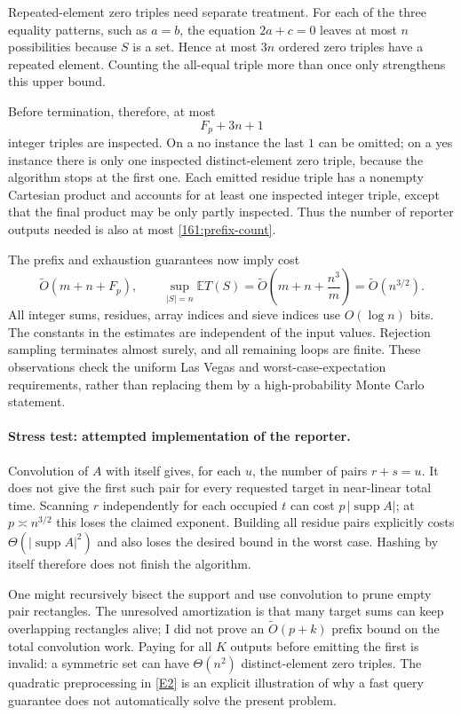 \documentclass[11pt,a4paper]{article}
\newcommand{\E}{\mathbb{E}}
\newcommand{\eref}[2]{\hyperlink{extra:#1:#2}{[E#2]}}
\numberwithin{equation}{section}
\begin{document}
Repeated-element zero triples need separate treatment. For each of the
three equality patterns, such as $a=b$, the equation $2a+c=0$ leaves at
most $n$ possibilities because $S$ is a set. Hence at most $3n$ ordered
zero triples have a repeated element. Counting the all-equal triple more
than once only strengthens this upper bound.

Before termination, therefore, at most
\begin{equation}\label{161:prefix-count}
 F_p+3n+1
\end{equation}
integer triples are inspected. On a no instance the last $1$ can be
omitted; on a yes instance there is only one inspected distinct-element
zero triple, because the algorithm stops at the first one. Each emitted
residue triple has a nonempty Cartesian product and accounts for at
least one inspected integer triple, except that the final product may
be only partly inspected. Thus the number of reporter outputs needed is
also at most \eqref{161:prefix-count}.

The prefix and exhaustion guarantees now imply cost
\[
 \widetilde O(m+n+F_p),\qquad
 \sup_{|S|=n}\E T(S)
 =\widetilde O\left(m+n+\frac{n^3}{m}\right)
 =\widetilde O(n^{3/2}).
\]
All integer sums, residues, array indices and sieve indices use
$O(\log n)$ bits. The constants in the estimates are independent of the
input values. Rejection sampling terminates almost surely, and all
remaining loops are finite. These observations check the uniform
Las Vegas and worst-case-expectation requirements, rather than replacing
them by a high-probability Monte Carlo statement.

\paragraph{Stress test: attempted implementation of the reporter.}
Convolution of $A$ with itself gives, for each $u$, the number of pairs
$r+s=u$. It does not give the first such pair for every requested target
in near-linear total time. Scanning $r$ independently for each occupied
$t$ can cost $p\,|\operatorname{supp}A|$; at
$p\asymp n^{3/2}$ this loses the claimed exponent. Building all residue
pairs explicitly costs $\Theta(|\operatorname{supp}A|^2)$ and also loses
the desired bound in the worst case. Hashing by itself therefore does
not finish the algorithm.

One might recursively bisect the support and use convolution to prune
empty pair rectangles. The unresolved amortization is that many target
sums can keep overlapping rectangles alive; I did not prove an
$\widetilde O(p+k)$ prefix bound on the total convolution work. Paying
for all $K$ outputs before emitting the first is invalid: a symmetric
set can have $\Theta(n^2)$ distinct-element zero triples. The quadratic
preprocessing in \eref{161}{2} is an explicit illustration of why a fast
query guarantee does not automatically solve the present problem.
\end{document}
